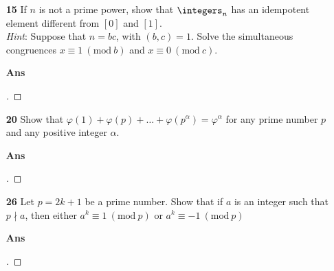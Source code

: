 \documentclass[paper=usletter, fontsize=12pt]{article}
\newcommand{\Mod}[1]{\ (\mathrm{mod}\ #1)}
\begin{document}
\begin{itemize}
\begin{itemize}
\begin{itemize}
            \end{itemize}

            \item[\textbf{15}] If $n$ is not a prime power, show that
            $\integers_n$ has an idempotent element different from $[0]$ and
            $[1]$.\\ \textit{Hint}: Suppose that $n=bc$, with $(b, c)=1$. Solve
            the simultaneous congruences $x \equiv 1 \Mod{b}$ and $x
            \equiv 0 \Mod{c}$.
            \item[\textbf{Ans}]
            \begin{proof}[\unskip\nopunct]
            \end{proof}
            \vspace{0.2in}

            \item[\textbf{20}] Show that
            $\varphi(1)+\varphi(p)+\ldots+\varphi(p^\alpha)=\varphi^\alpha$ for
            any prime number $p$ and any positive integer $\alpha$.
            \item[\textbf{Ans}]
            \begin{proof}[\unskip\nopunct]
            \end{proof}
            \vspace{0.2in}

            \item[\textbf{26}] Let $p=2k+1$ be a prime number. Show that if $a$
            is an integer such that $p \nmid a$, then either $a^k \equiv 1
            \Mod{p}$ or $a^k \equiv -1 \Mod{p}$
            \item[\textbf{Ans}]
            \begin{proof}[\unskip\nopunct]
            \end{proof}
            \vspace{0.2in}

        \end{itemize}

    \end{itemize}
\end{document}
